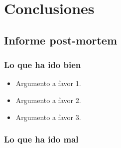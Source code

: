 \documentclass[12pt,twoside,titlepage]{report}
\begin{document}

\chapter{Conclusiones}




\section{Informe post-mortem}

\subsection{Lo que ha ido bien}

\begin{itemize}
	\item Argumento a favor 1.

	\item Argumento a favor 2.

	\item Argumento a favor 3.
\end{itemize}

\subsection{Lo que ha ido mal}
\end{document}
